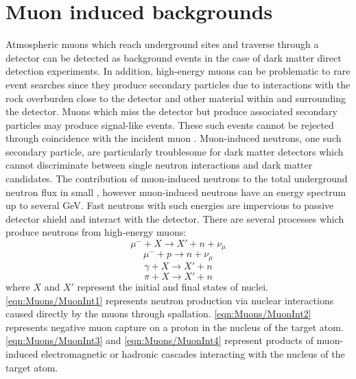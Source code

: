\section{Muon induced backgrounds}\label{sec:Muons/InducedBackgrounds}
Atmospheric muons which reach underground sites and traverse through a detector can be detected as background events in the case of dark matter direct detection experiments. In addition, high-energy muons can be problematic to rare event searches since they produce secondary particles due to interactions with the rock overburden close to the detector and other material within and surrounding the detector. Muons which miss the detector but produce associated secondary particles may produce signal-like events. These such events cannot be rejected through coincidence with the incident muon \cite{mei,Lindote:2008nq}. Muon-induced neutrons, one such secondary particle, are particularly troublesome for dark matter detectors which cannot discriminate between single neutron interactions and dark matter candidates. The contribution of muon-induced neutrons to the total underground neutron flux in small \cite{LZ_SIMS}, however muon-induced neutrons have an energy spectrum up to several GeV. Fast neutrons with such energies are impervious to passive detector shield and interact with the detector. There are several processes which produce neutrons from high-energy muons:
\begin{equation}\label{eqn:Muons/MuonInt1}
    \mu^-+X\rightarrow X' + n+\nu_\mu
\end{equation}
\begin{equation}\label{eqn:Muons/MuonInt2}
    \mu^-+p\rightarrow n+\nu_\mu
\end{equation}
\begin{equation}\label{eqn:Muons/MuonInt3}
    \gamma+X\rightarrow X'+n
\end{equation}
\begin{equation}\label{eqn:Muons/MuonInt4}
    \pi+X\rightarrow X'+n
\end{equation} 
where $X$ and $X'$ represent the initial and final states of nuclei. \autoref{eqn:Muons/MuonInt1} represents neutron production via nuclear interactions caused directly by the muons through spallation. \autoref{eqn:Muons/MuonInt2} represents negative muon capture on a proton in the nucleus of the target atom. \autoref{eqn:Muons/MuonInt3} and \autoref{eqn:Muons/MuonInt4} represent products of muon-induced electromagnetic or hadronic cascades interacting with the nucleus of the target atom.
